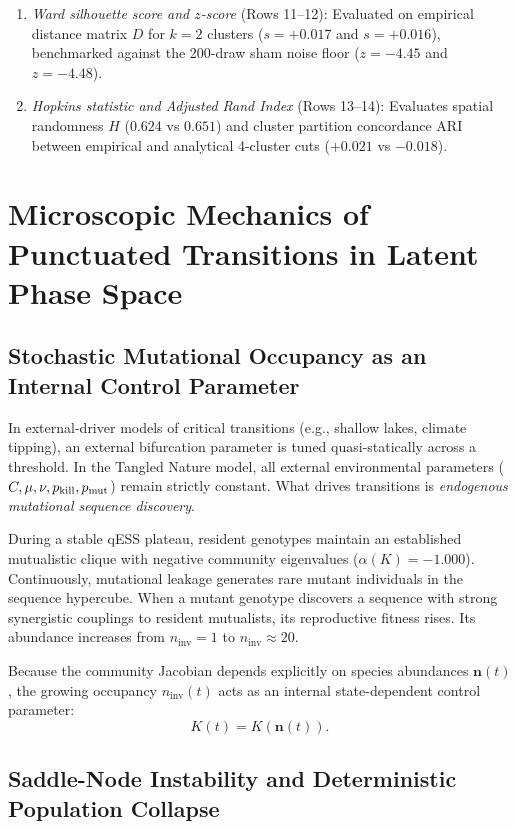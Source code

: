\documentclass[11pt,a4paper]{article}
\newcommand{\pk}{p_{\rm kill}}
\newcommand{\pmut}{p_{\rm mut}}
\begin{document}
\begin{enumerate}
\item \textit{Ward silhouette score and $z$-score} (Rows 11--12): Evaluated on empirical distance matrix $D$ for $k=2$ clusters ($s = +0.017$ and $s = +0.016$), benchmarked against the 200-draw sham noise floor ($z = -4.45$ and $z = -4.48$).
\item \textit{Hopkins statistic and Adjusted Rand Index} (Rows 13--14): Evaluates spatial randomness $H$ ($0.624$ vs $0.651$) and cluster partition concordance ARI between empirical and analytical 4-cluster cuts ($+0.021$ vs $-0.018$).
\end{enumerate}

\section{Microscopic Mechanics of Punctuated Transitions in Latent Phase Space}
\label{sec:transition}

\subsection{Stochastic Mutational Occupancy as an Internal Control Parameter}

In external-driver models of critical transitions (e.g., shallow lakes, climate tipping), an external bifurcation parameter is tuned quasi-statically across a threshold. In the Tangled Nature model, all external environmental parameters ($C, \mu, \nu, \pk, \pmut$) remain strictly constant. What drives transitions is \emph{endogenous mutational sequence discovery}.

During a stable qESS plateau, resident genotypes maintain an established mutualistic clique with negative community eigenvalues ($\alpha(K) = -1.000$). Continuously, mutational leakage generates rare mutant individuals in the sequence hypercube. When a mutant genotype discovers a sequence with strong synergistic couplings to resident mutualists, its reproductive fitness rises. Its abundance increases from $n_{\mathrm{inv}} = 1$ to $n_{\mathrm{inv}} \approx 20$.

Because the community Jacobian depends explicitly on species abundances $\mathbf{n}(t)$, the growing occupancy $n_{\mathrm{inv}}(t)$ acts as an internal state-dependent control parameter:
\begin{equation}
K(t) = K(\mathbf{n}(t)).
\end{equation}

\subsection{Saddle-Node Instability and Deterministic Population Collapse}
\end{document}
